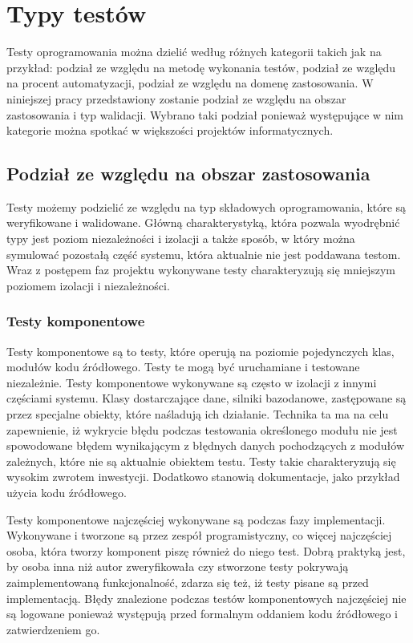 \section{Typy testów}
Testy oprogramowania można dzielić według różnych kategorii takich jak na przykład: podział ze względu na metodę wykonania testów, podział ze względu na procent automatyzacji, podział ze względu na domenę zastosowania. W niniejszej pracy przedstawiony zostanie podział ze względu na obszar zastosowania i typ walidacji. Wybrano taki podział ponieważ występujące w nim kategorie można spotkać w większości projektów informatycznych.
 
\subsection{Podział ze względu na obszar zastosowania}
Testy możemy podzielić ze względu na typ składowych oprogramowania, które są weryfikowane i walidowane. Główną charakterystyką, która pozwala wyodrębnić typy jest poziom niezależności i izolacji a także sposób, w który można symulować pozostałą część systemu, która aktualnie nie jest poddawana testom. Wraz z postępem faz projektu wykonywane testy charakteryzują się mniejszym poziomem izolacji i niezależności. 


\subsubsection{Testy komponentowe}
Testy komponentowe są to testy, które operują na poziomie pojedynczych klas, modułów kodu źródłowego. Testy te mogą być uruchamiane i testowane niezależnie. Testy komponentowe wykonywane są często w izolacji z innymi częściami systemu. Klasy dostarczające dane, silniki bazodanowe, zastępowane są przez specjalne obiekty, które naśladują ich działanie. Technika ta ma na celu zapewnienie, iż wykrycie błędu podczas testowania określonego modułu nie jest spowodowane błędem wynikającym z błędnych danych pochodzących z modułów zależnych, które nie są aktualnie obiektem testu. Testy takie charakteryzują się wysokim zwrotem inwestycji. Dodatkowo stanowią dokumentacje, jako przykład użycia kodu źródłowego.

Testy komponentowe najczęściej wykonywane są podczas fazy implementacji. Wykonywane i tworzone są przez zespół programistyczny, co więcej najczęściej osoba, która tworzy komponent piszę również do niego test. Dobrą praktyką jest, by osoba inna niż autor zweryfikowała czy stworzone testy pokrywają zaimplementowaną funkcjonalność, zdarza się też, iż testy pisane są przed implementacją. Błędy znalezione podczas testów komponentowych najczęściej nie są logowane ponieważ występują przed formalnym oddaniem kodu źródłowego i zatwierdzeniem go.

